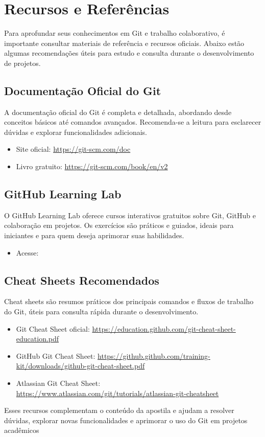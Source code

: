 \newpage
\section{Recursos e Referências}

Para aprofundar seus conhecimentos em Git e trabalho colaborativo, é importante consultar materiais de referência e recursos oficiais. Abaixo estão algumas recomendações úteis para estudo e consulta durante o desenvolvimento de projetos.

\subsection{Documentação Oficial do Git}

A documentação oficial do Git é completa e detalhada, abordando desde conceitos básicos até comandos avançados. Recomenda-se a leitura para esclarecer dúvidas e explorar funcionalidades adicionais.

\begin{itemize}
    \item Site oficial: \url{https://git-scm.com/doc}
    \item Livro gratuito: \url{https://git-scm.com/book/en/v2}
\end{itemize}

\subsection{GitHub Learning Lab}

O GitHub Learning Lab oferece cursos interativos gratuitos sobre Git, GitHub e colaboração em projetos. Os exercícios são práticos e guiados, ideais para iniciantes e para quem deseja aprimorar suas habilidades.


\begin{itemize}
    \item Acesse: 
\end{itemize}

\subsection{Cheat Sheets Recomendados}

Cheat sheets são resumos práticos dos principais comandos e fluxos de trabalho do Git, úteis para consulta rápida durante o desenvolvimento.

\begin{itemize}
    \item Git Cheat Sheet oficial: \url{https://education.github.com/git-cheat-sheet-education.pdf}
    \item GitHub Git Cheat Sheet: \url{https://github.github.com/training-kit/downloads/github-git-cheat-sheet.pdf}
    \item Atlassian Git Cheat Sheet: \url{https://www.atlassian.com/git/tutorials/atlassian-git-cheatsheet}
\end{itemize}

Esses recursos complementam o conteúdo da apostila e ajudam a resolver dúvidas, explorar novas funcionalidades e aprimorar o uso do Git em projetos acadêmicos